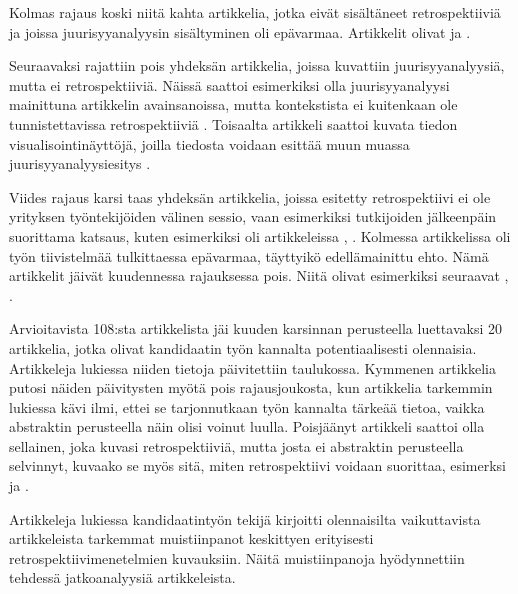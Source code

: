 Kolmas rajaus koski niitä kahta artikkelia, jotka eivät sisältäneet retrospektiiviä ja joissa juurisyyanalyysin sisältyminen oli epävarmaa. Artikkelit olivat \citep{anquetil2007software} ja \citep{wang2004strider}.

Seuraavaksi rajattiin pois yhdeksän artikkelia, joissa kuvattiin juurisyyanalyysiä, mutta ei retrospektiiviä. Näissä saattoi esimerkiksi olla juurisyyanalyysi mainittuna artikkelin avainsanoissa, mutta kontekstista ei kuitenkaan ole tunnistettavissa retrospektiiviä \citep{yu1998software}. Toisaalta artikkeli saattoi kuvata tiedon visualisointinäyttöjä, joilla tiedosta voidaan esittää muun muassa juurisyyanalyysiesitys \citep{hao2008density}.

Viides rajaus karsi taas yhdeksän artikkelia, joissa esitetty retrospektiivi ei ole yrityksen työntekijöiden välinen sessio, vaan esimerkiksi tutkijoiden jälkeenpäin suorittama katsaus, kuten esimerkiksi oli artikkeleissa \citep{wolforth2010generalizable}, \citep{ardimento2004multiview}. Kolmessa artikkelissa oli työn tiivistelmää tulkittaessa epävarmaa, täyttyikö edellämainittu ehto. Nämä artikkelit jäivät kuudennessa rajauksessa pois. Niitä olivat esimerkiksi seuraavat \citep{xu2012enabling}, \citep{grady1996software}. 

Arvioitavista 108:sta artikkelista jäi kuuden karsinnan perusteella luettavaksi 20 artikkelia, jotka olivat kandidaatin työn kannalta potentiaalisesti olennaisia. Artikkeleja lukiessa niiden tietoja päivitettiin taulukossa. Kymmenen artikkelia putosi näiden päivitysten myötä pois rajausjoukosta, kun artikkelia tarkemmin lukiessa kävi ilmi, ettei se tarjonnutkaan työn kannalta tärkeää tietoa, vaikka abstraktin perusteella näin olisi voinut luulla. Poisjäänyt artikkeli saattoi olla sellainen, joka kuvasi retrospektiiviä, mutta josta ei abstraktin perusteella selvinnyt, kuvaako se myös sitä, miten retrospektiivi voidaan suorittaa, esimerksi \citep{glass2002loyal} ja \citep{drury2012obstacles}.

Artikkeleja lukiessa kandidaatintyön tekijä kirjoitti olennaisilta vaikuttavista artikkeleista tarkemmat muistiinpanot keskittyen erityisesti retrospektiivimenetelmien kuvauksiin. Näitä muistiinpanoja hyödynnettiin tehdessä jatkoanalyysiä artikkeleista.

